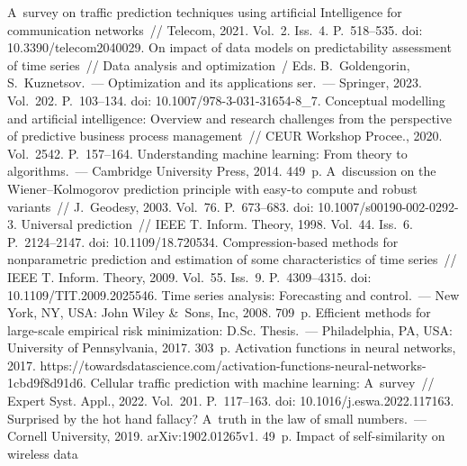 \begin{multicols}{2}
  
{\small\frenchspacing
 {\baselineskip=10.5pt
 \begin{thebibliography}{99}
 A~survey on traffic prediction techniques using artificial 
Intelligence for communication networks~// Telecom, 2021. Vol.~2. Iss.~4. P.~518--535.
doi: 10.3390/telecom2040029.
 On impact of data models on predictability assessment of time series~// Data 
analysis and optimization~/ Eds. B.~Goldengorin, S.~Kuznetsov.~--- Optimization and its applications
ser.~--- Springer, 2023. Vol.~202.
P.~103--134.  doi:  10.1007/978-3-031-31654-8\_7.
 Conceptual modelling and artificial intelligence: Overview and research 
challenges from the perspective of predictive business process management~// CEUR Workshop 
Procee., 2020. Vol.~2542. P.~157--164. 
 Understanding machine learning: From theory to algorithms.~--- 
Cambridge University Press, 2014. 449~p.
 A~discussion on the Wiener--Kolmogorov prediction 
principle with easy-to compute and robust variants~// J.~Geodesy, 2003. Vol.~76. P.~673--683.
doi: 10.1007/s00190-002-0292-3.
 Universal prediction~// IEEE T. Inform. Theory, 1998. Vol.~44. 
Iss.~6. P.~2124--2147. doi: 10.1109/18.720534.
 Compression-based methods for nonparametric prediction and estimation of 
some characteristics of time series~// IEEE T. Inform. Theory, 2009. Vol.~55. Iss.~9.  
P.~4309--4315. doi: 10.1109/TIT.2009.2025546.
 Time series analysis: Forecasting and  
control.~--- New York, NY, USA: John Wiley \&~Sons, Inc, 2008. 709~p.
 Efficient methods for large-scale empirical risk minimization: D.Sc. 
Thesis.~--- Philadelphia, PA, USA: University of Pennsylvania, 2017. 303~p.
 Activation functions in neural networks, 2017. {\sf 
https://towardsdatascience.com/activation-functions-neural-networks-1cbd9f8d91d6}.
 Cellular traffic prediction with machine learning: A~survey~// Expert Syst. Appl., 2022. Vol.~201. P.~117--163. 
doi: 10.1016/j.eswa.2022.117163.
 Surprised by the hot hand fallacy? A~truth in the law of small 
numbers.~--- Cornell University, 2019. arXiv:1902.01265v1.  49~p.
 Impact of self-similarity on wireless data 

\end{thebibliography}}}
\end{multicols}
